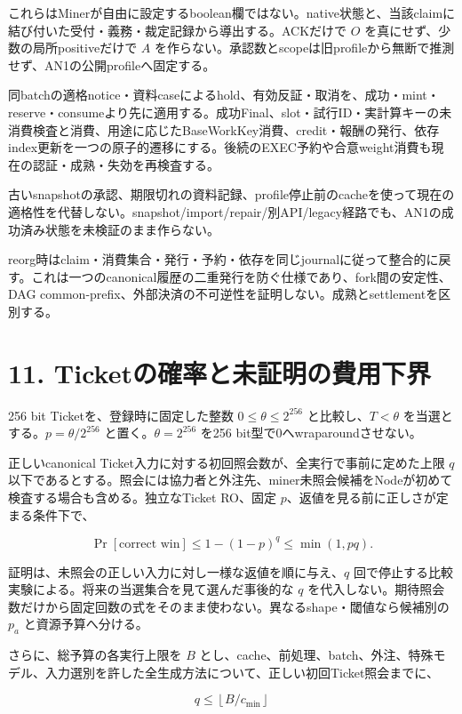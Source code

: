 \documentclass[
  10pt,
]{article}
\begin{document}
これらはMinerが自由に設定するboolean欄ではない。native状態と、当該claimに結び付いた受付・義務・裁定記録から導出する。ACKだけで
\(O\) を真にせず、少数の局所positiveだけで \(A\)
を作らない。承認数とscopeは旧profileから無断で推測せず、AN1の公開profileへ固定する。

同batchの適格notice・資料caseによるhold、有効反証・取消を、成功・mint・reserve・consumeより先に適用する。成功Final、slot・試行ID・実計算キーの未消費検査と消費、用途に応じたBaseWorkKey消費、credit・報酬の発行、依存index更新を一つの原子的遷移にする。後続のEXEC予約や合意weight消費も現在の認証・成熟・失効を再検査する。

古いsnapshotの承認、期限切れの資料記録、profile停止前のcacheを使って現在の適格性を代替しない。snapshot/import/repair/別API/legacy経路でも、AN1の成功済み状態を未検証のまま作らない。

reorg時はclaim・消費集合・発行・予約・依存を同じjournalに従って整合的に戻す。これは一つのcanonical履歴の二重発行を防ぐ仕様であり、fork間の安定性、DAG
common-prefix、外部決済の不可逆性を証明しない。成熟とsettlementを区別する。

\section{11.
Ticketの確率と未証明の費用下界}\label{ticketux306eux78baux7387ux3068ux672aux8a3cux660eux306eux8cbbux7528ux4e0bux754c}

256 bit Ticketを、登録時に固定した整数 \(0\le\theta\le2^{256}\)
と比較し、\(T<\theta\) を当選とする。\(p=\theta/2^{256}\)
と置く。\(\theta=2^{256}\) を256 bit型で0へwraparoundさせない。

正しいcanonical Ticket入力に対する初回照会数が、全実行で事前に定めた上限
\(q\)
以下であるとする。照会には協力者と外注先、miner未照会候補をNodeが初めて検査する場合も含める。独立なTicket
RO、固定 \(p\)、返値を見る前に正しさが定まる条件下で、

\[\Pr[\text{correct win}]\le 1-(1-p)^q\le\min(1,pq).\]

証明は、未照会の正しい入力に対し一様な返値を順に与え、\(q\)
回で停止する比較実験による。将来の当選集合を見て選んだ事後的な \(q\)
を代入しない。期待照会数だけから固定回数の式をそのまま使わない。異なるshape・閾値なら候補別の
\(p_a\) と資源予算へ分ける。

さらに、総予算の各実行上限を \(B\)
とし、cache、前処理、batch、外注、特殊モデル、入力選別を許した全生成方法について、正しい初回Ticket照会までに、

\[q\le\left\lfloor B/c_{\min}\right\rfloor\]
\end{document}
